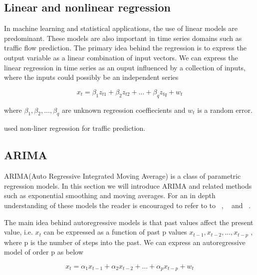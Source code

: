 \subsection{Linear and nonlinear regression}
In machine learning and statistical applications, the use of linear models are predominant. These
models are also important in time series domains such as traffic flow prediction. The primary
idea behind the regression is to express the output variable as a linear combination of input
vectors. We can express the linear regression in time series as an ouput influenced by a
collection of inputs, where the inputs could possibly be an independent series

        \begin{equation}
            x_{t} = \beta_{1}z_{t1} + \beta_{2}z_{t2} + ... + \beta_{q}z_{tq} + w_{t}
        \end{equation}

where $ \beta_{1}, \beta_{2},...,\beta_{q} $ are unknown regression coeffiecients and $w_{t}$ is
a random error.

\citet{hogberg1976estimation} used non-liner regression for traffic prediction.

\subsection{ARIMA}

ARIMA(Auto Regressive Integrated Moving Average) is a class of parametric regression models. In
this section we will introduce ARIMA and related methods such as exponential smoothing and moving
averages. For an in depth understanding of these models the reader is encouraged to refer to to
~\citet{tong1990non}, ~\citet{brockwell2006introduction} and ~\citet{box2015time}.

The main idea behind autoregressive models is that past values affect the present value, i.e.
$x_{t}$ can be expressed as a function of past p values $ x_{t-1}, x_{t-2},...,x_{t-p} $ , where
p is the number of steps into the past. We can express an autoregressive model of order p as below

        \begin{equation}
          x_{t} = \alpha_{1}x_{t-1} + \alpha_{2}x_{t-2} + ... + \alpha_{p}x_{t-p} + w_{t}
        \end{equation}

